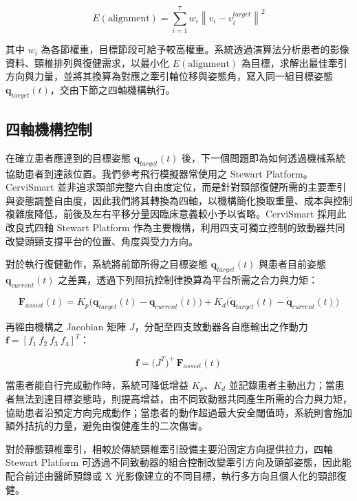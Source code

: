 \documentclass[12pt,a4paper]{article}
\begin{document}
\begin{equation}
E(\text{alignment}) = \sum_{i=1}^{7} w_i \left\| v_i - v_i^{target} \right\|^2
\label{eq:alignment}
\end{equation}

其中 $w_i$ 為各節權重，目標節段可給予較高權重。系統透過演算法分析患者的影像資料、頸椎排列與復健需求，以最小化 $E(\text{alignment})$ 為目標，求解出最佳牽引方向與力量，並將其換算為對應之牽引軸位移與姿態角，寫入同一組目標姿態 $\mathbf{q}_{target}(t)$，交由下節之四軸機構執行。
\subsection{四軸機構控制}

在確立患者應達到的目標姿態 $\mathbf{q}_{target}(t)$ 後，下一個問題即為如何透過機械系統協助患者到達該位置。我們參考飛行模擬器常使用之 Stewart Platform\cite{stewart1965}。CerviSmart 並非追求頭部完整六自由度定位，而是針對頸部復健所需的主要牽引與姿態調整自由度，因此我們將其轉換為四軸，以機構簡化換取重量、成本與控制複雜度降低，前後及左右平移分量因臨床意義較小予以省略。CerviSmart 採用此改良式四軸 Stewart Platform 作為主要機構，利用四支可獨立控制的致動器共同改變頭頸支撐平台的位置、角度與受力方向。

對於執行復健動作，系統將前節所得之目標姿態 $\mathbf{q}_{target}(t)$ 與患者目前姿態 $\mathbf{q}_{current}(t)$ 之差異，透過下列阻抗控制律換算為平台所需之合力與力矩：

\begin{equation}
\mathbf{F}_{assist}(t) = K_p\big(\mathbf{q}_{target}(t) - \mathbf{q}_{current}(t)\big) + K_d\big(\dot{\mathbf{q}}_{target}(t) - \dot{\mathbf{q}}_{current}(t)\big)
\label{eq:impedance}
\end{equation}

再經由機構之 Jacobian 矩陣 $J$，分配至四支致動器各自應輸出之作動力 $\mathbf{f} = [f_1\ f_2\ f_3\ f_4]^{T}$：

\begin{equation}
\mathbf{f} = \big(J^{T}\big)^{+}\,\mathbf{F}_{assist}(t)
\label{eq:force_alloc}
\end{equation}

當患者能自行完成動作時，系統可降低增益 $K_p$、$K_d$ 並記錄患者主動出力；當患者無法到達目標姿態時，則提高增益，由不同致動器共同產生所需的合力與力矩，協助患者沿預定方向完成動作；當患者的動作超過最大安全閾值時，系統則會施加額外拮抗的力量，避免由復健產生的二次傷害。

對於靜態頸椎牽引，相較於傳統頸椎牽引設備主要沿固定方向提供拉力\cite{abi-aad2023}，四軸 Stewart Platform 可透過不同致動器的組合控制改變牽引方向及頭部姿態，因此能配合前述由醫師預錄或 X 光影像建立的不同目標，執行多方向且個人化的頸部復健。
\end{document}
